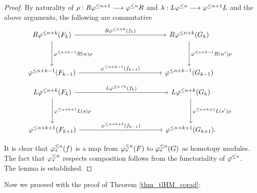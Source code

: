 \begin{proof}
By naturality of $\rho : R\varphi^{\leq n + 1} \longrightarrow \varphi^{\leq n} R$ and 
$\lambda: L\varphi^{\leq n} \longrightarrow \varphi^{\leq n + 1}L$ and the above arguments, 
the following are commutative
\[
\begin{tikzcd}[column sep=12em, row sep=huge]
R\tlHI{n + k}(F_k) \arrow{r}{R \tlHI{n + k}(f_k)} 
   \arrow{d}{\tlHI{n + k - 1}R(\deloop) \rho} &
R\tlHI{n + k}(G_k) 
   \arrow{d}{\tlHI{n + k - 1}R(\deloop') \rho} \\
\tlHI{n + k - 1}(F_{k - 1}) 
   \arrow{r}{\tlHI{n + k - 1}(f_{k - 1})} &
\tlHI{n + k - 1}(G_{k - 1}) 
\end{tikzcd}
\]
\[
\begin{tikzcd}[column sep=12em, row sep=huge]
L\tlHI{n + k}(F_k) \arrow{r}{L \tlHI{n + k}(f_k)} 
   \arrow{d}{\tlHI{n + k + 1}L(\susp) \rho} &
L\tlHI{n + k}(G_k) 
   \arrow{d}{\tlHI{n + k + 1}L(\susp') \rho} \\
\tlHI{n + k + 1}(F_{k + 1}) 
   \arrow{r}{\tlHI{n + k + 1}(f_{k - 1})} &
\tlHI{n + k + 1}(G_{k + 1}).
\end{tikzcd}
\]

It is clear that $\varphi^{\leq n}_{*}(f)$ is a map from $\varphi^{\leq n}_{*}(F)$ to 
$\varphi^{\leq n}_{*}(G)$ as homotopy modules. The fact that $\varphi^{\leq n}_{*}$ 
respects composition follows from the functoriality of $\varphi^{\leq *}$.
The lemma is established.
\end{proof}

Now we proceed with the proof of Theorem \ref{thm_tlHM_corad}:

